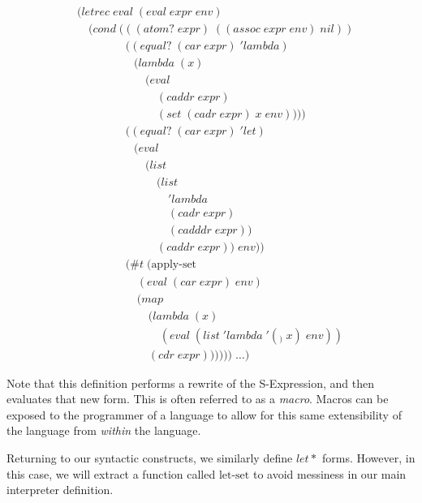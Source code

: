 \begin{figure}[htp]
\footnotesize
\caption{}\label{fig:syntaxSugarEval}
\begin{align*}
& (letrec \; eval \; (eval \; expr \; env)
\\& \quad (cond \; (((atom? \; expr) \; ((assoc \; expr \; env) \; nil))
\\& \qquad \qquad \; ((equal? \; (car \; expr) \; 'lambda) \; 
\\& \qquad \qquad \quad (lambda \; (x) \; 
\\& \qquad \qquad \qquad (eval \; 
\\& \qquad \qquad \qquad \quad (caddr \; expr) \; 
\\& \qquad \qquad \qquad \quad (set \; (cadr \; expr) \; x \; env))))
\\& \qquad \qquad \; ((equal? \; (car \; expr) \; 'let)
\\& \qquad \qquad \quad (eval \; 
\\& \qquad \qquad \qquad (list \; 
\\& \qquad \qquad \qquad \quad (list \; 
\\& \qquad \qquad \qquad \qquad 'lambda \; 
\\& \qquad \qquad \qquad \qquad (cadr \; expr) \; 
\\& \qquad \qquad \qquad \qquad (cadddr \; expr)) \; 
\\& \qquad \qquad \qquad \quad (caddr \; expr)) \; env))
\\& \qquad \qquad \; (\#t \; (\text{apply-set} \; 
\\& \qquad \qquad \quad \; (eval \; (car \; expr) \; env) \; 
\\& \qquad \qquad \quad \; (map \; 
\\& \qquad \qquad \qquad \; (lambda \; (x) \; 
\\& \qquad \qquad \qquad \quad \; (eval \; (list \; 'lambda \; '(_) \; x) \; env)) \; 
\\& \qquad \qquad \qquad \; (cdr \; expr)))))) \; \dots)
\end{align*}
\end{figure}

Note that this definition performs a rewrite of the S-Expression, and then
evaluates that new form. This is often referred to as a \emph{macro}. Macros can
be exposed to the programmer of a language to allow for this same 
extensibility of the language from \emph{within} the language.

Returning to our syntactic constructs, we similarly define $let*$ forms. 
However, in this case, we will extract a function called $\text{let-set}$ to avoid 
messiness in our main interpreter definition.

